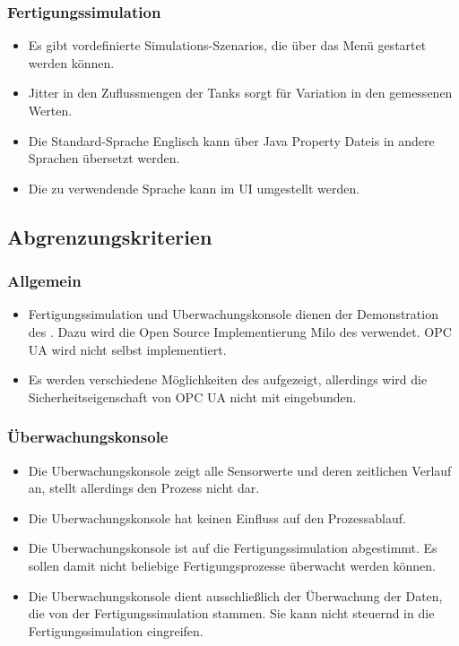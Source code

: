 \documentclass[parskip=full]{scrartcl}
\begin{document}
\subsubsection{Fertigungssimulation}
\begin{itemize}
  \item Es gibt vordefinierte \glspl{Simulations-Szenario}, die über das Menü gestartet werden können.
  \item \gls{Jitter} in den Zuflussmengen der Tanks sorgt f\"ur Variation in den gemessenen Werten.
  \item Die Standard-Sprache Englisch kann über \glspl{Java Property Datei} in andere Sprachen übersetzt werden.
  \item Die zu verwendende Sprache kann im UI umgestellt werden.
\end{itemize}

\subsection{Abgrenzungskriterien}
\subsubsection{Allgemein}
\begin{itemize}
  \item \gls{Fertigungssimulation} und \gls{Uberwachungskonsole} dienen der Demonstration des . Dazu wird die Open Source
    Implementierung \gls{Milo} des  verwendet. \gls{OPC UA} wird nicht selbst implementiert.
  \item Es werden verschiedene Möglichkeiten des  aufgezeigt, allerdings wird die Sicherheitseigenschaft von \gls{OPC UA} nicht mit eingebunden.
\end{itemize}

\subsubsection{Überwachungskonsole}
\begin{itemize}
  \item Die \gls{Uberwachungskonsole} zeigt alle Sensorwerte und deren zeitlichen Verlauf an, stellt allerdings den Prozess nicht dar.
  \item Die \gls{Uberwachungskonsole} hat keinen Einfluss auf den Prozessablauf.
  \item Die \gls{Uberwachungskonsole} ist auf die \gls{Fertigungssimulation} abgestimmt. Es sollen damit nicht beliebige
    Fertigungsprozesse \"uberwacht werden k\"onnen.
  \item Die \gls{Uberwachungskonsole} dient ausschlie{\ss}lich der \"Uberwachung der Daten, die von der \gls{Fertigungssimulation}
    stammen. Sie kann nicht steuernd in die \gls{Fertigungssimulation} eingreifen.
\end{itemize}
\end{document}
